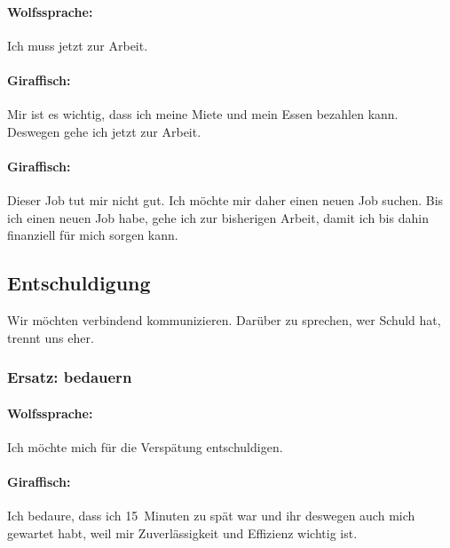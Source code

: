 \paragraph{Wolfssprache:} Ich muss jetzt zur Arbeit.

\paragraph{Giraffisch:} Mir ist es wichtig, dass ich meine Miete und mein Essen bezahlen kann. Deswegen gehe ich jetzt zur Arbeit.

\paragraph{Giraffisch:} Dieser Job tut mir nicht gut. Ich möchte mir daher einen neuen Job suchen. Bis ich einen neuen Job habe, gehe ich zur bisherigen Arbeit, damit ich bis dahin finanziell für mich sorgen kann.

\subsection{Entschuldigung}

Wir möchten verbindend kommunizieren. Darüber zu sprechen, wer Schuld hat, trennt uns eher.

\subsubsection{Ersatz: bedauern}

\paragraph{Wolfssprache:} Ich möchte mich für die Verspätung entschuldigen.

\paragraph{Giraffisch:} Ich bedaure, dass ich 15~Minuten zu spät war und ihr deswegen auch mich gewartet habt, weil mir Zuverlässigkeit und Effizienz wichtig ist.
